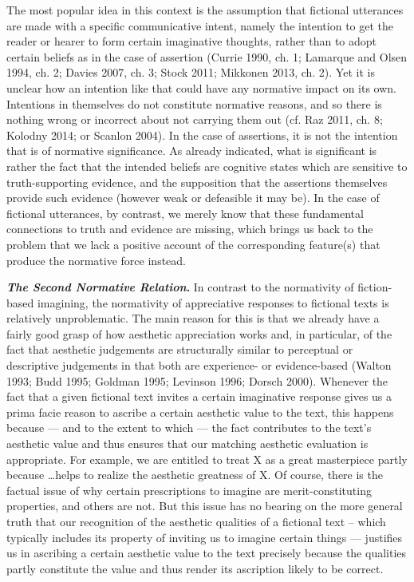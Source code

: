 The most popular idea in this context is the assumption that fictional utterances are made with a specific communicative intent, namely the intention to get the reader or hearer to form certain imaginative thoughts, rather than to adopt certain beliefs as in the case of assertion (Currie 1990, ch. 1; Lamarque and Olsen 1994, ch. 2; Davies 2007, ch. 3; Stock 2011; Mikkonen 2013, ch. 2). Yet it is unclear how an intention like that could have any normative impact on its own. Intentions in themselves do not constitute normative reasons, and so there is nothing wrong or incorrect about not carrying them out (cf. Raz 2011, ch. 8; Kolodny 2014; or Scanlon 2004). In the case of assertions, it is not the intention that is of normative significance. As already indicated, what is significant is rather the fact that the intended beliefs are cognitive states which are sensitive to truth-supporting evidence, and the supposition that the assertions themselves provide such evidence (however weak or defeasible it may be). In the case of fictional utterances, by contrast, we merely know that these fundamental connections to truth and evidence are missing, which brings us back to the problem that we lack a positive account of the corresponding feature(s) that produce the normative force instead.

\vspace{.2cm}
\noindent\textbf{\emph{The Second Normative Relation}.} In contrast to the normativity of fiction-based imagining, the normativity of appreciative responses to fictional texts is relatively unproblematic. The main reason for this is that we already have a fairly good grasp of how aesthetic appreciation works and, in particular, of the fact that aesthetic judgements are structurally similar to perceptual or descriptive judgements in that both are experience- or evidence-based (Walton 1993; Budd 1995; Goldman 1995; Levinson 1996; Dorsch 2000). Whenever the fact that a given fictional text invites a certain imaginative response gives us a prima facie reason to ascribe a certain aesthetic value to the text, this happens because --- and to the extent to which --- the fact contributes to the text's aesthetic value and thus ensures that our matching aesthetic evaluation is appropriate. For example, we are entitled to treat X as a great masterpiece partly because \ldots helps to realize the aesthetic greatness of X. Of course, there is the factual issue of why certain prescriptions to imagine are merit-constituting properties, and others are not. But this issue has no bearing on the more general truth that our recognition of the aesthetic qualities of a fictional text -- which typically includes its property of inviting us to imagine certain things --- justifies us in ascribing a certain aesthetic value to the text precisely because the qualities partly constitute the value and thus render its ascription likely to be correct.

